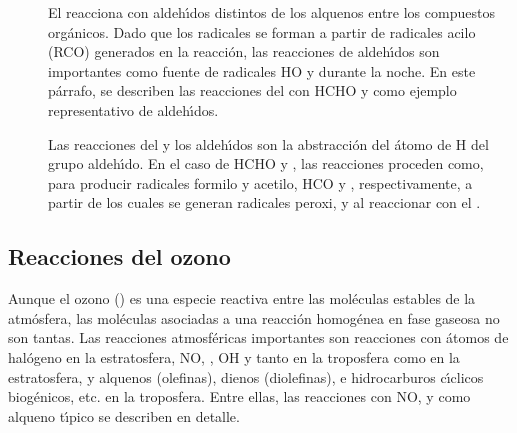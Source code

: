 \begin{description}
\item[ ] 
El  reacciona con aldeh\'{\i}dos distintos de los alquenos entre los compuestos org\'anicos. Dado que los radicales  se forman a partir de radicales acilo (RCO) generados en la reacci\'on, las reacciones de aldeh\'{\i}dos  son importantes como fuente de radicales HO y  durante la noche. En este p\'arrafo, se describen las reacciones del  con HCHO y  como ejemplo representativo de aldeh\'{\i}dos.

Las reacciones del  y los aldeh\'{\i}dos son la abstracci\'on del \'atomo de H del grupo aldeh\'{\i}do. En el caso de HCHO y , las reacciones proceden como,
para producir radicales formilo y acetilo, HCO y , respectivamente, a partir de los cuales se generan radicales peroxi,  y  al reaccionar  con el .
\end{description}

\subsection{Reacciones del ozono}
Aunque el ozono () es una especie reactiva entre las mol\'eculas estables de la atm\'osfera, las mol\'eculas asociadas a una reacci\'on homog\'enea en fase gaseosa no son tantas. Las reacciones atmosf\'ericas importantes son reacciones con \'atomos de hal\'ogeno en la estratosfera, NO, , OH y  tanto en la troposfera como en la estratosfera, y alquenos (olefinas), dienos (diolefinas), e hidrocarburos c\'{\i}clicos biog\'enicos, etc. en la troposfera. Entre ellas, las reacciones con NO,  y  como alqueno t\'{\i}pico se describen en detalle.

